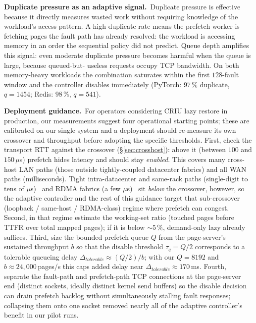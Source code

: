 \documentclass[journal]{IEEEtran}
\newcommand{\qthr}{\ensuremath{\tau_q}}
\begin{document}
\textbf{Duplicate pressure as an adaptive signal.}\, Duplicate pressure is
effective because it directly measures wasted work without requiring
knowledge of the workload's access pattern. A high duplicate rate means the
prefetch worker is fetching pages the fault path has already resolved:
the workload is accessing memory in an order the sequential policy did not
predict. Queue depth amplifies this signal: even moderate duplicate
pressure becomes harmful when the queue is large, because queued-but-
useless requests occupy TCP bandwidth. On both memory-heavy workloads the
combination saturates within the first $128$-fault window and the
controller disables immediately (PyTorch: $97\,\%$ duplicate, $q\!=\!1454$;
Redis: $98\,\%$, $q\!=\!541$).

\textbf{Deployment guidance.}\, For operators considering CRIU lazy restore
in production, our measurements suggest four operational starting points;
these are calibrated on our single system and a deployment should re-measure
its own crossover and throughput before adopting the specific thresholds.
First,
check the transport RTT against the crossover (\S\ref{sec:crosshost}): above
it (between $100$ and $150\,\mu$s) prefetch hides latency and should stay
\emph{enabled}. This covers many cross-host LAN paths (those outside
tightly-coupled datacenter fabrics) and all WAN paths (milliseconds). Tight intra-datacenter
and same-rack paths (single-digit to tens of $\mu$s)~\cite{gao2016network}
and RDMA fabrics (a few $\mu$s)~\cite{gu2017infiniswap} sit \emph{below} the
crossover, however, so the adaptive controller and the rest
of this guidance target that sub-crossover (loopback / same-host /
RDMA-class) regime where prefetch can congest. Second, in that regime estimate the
working-set ratio (touched pages before TTFR over total mapped pages); if it
is below ${\sim}5\,\%$, demand-only lazy already suffices. Third, size the
bounded prefetch queue $Q$ from the page-server's sustained throughput $b$
so that the disable threshold $\qthr\!=\!Q/2$ corresponds to a tolerable
queueing delay $\Delta_\textit{tolerable}\!\approx\!(Q/2)/b$; with our
$Q\!=\!8192$ and $b\!\approx\!24{,}000$\,pages/s this caps added delay near
$\Delta_\textit{tolerable}\!\approx\!170$\,ms. Fourth, separate the
fault-path and prefetch-path TCP connections at the page-server end
(distinct sockets, ideally distinct kernel send buffers) so the disable
decision can drain prefetch backlog without simultaneously stalling fault
responses; collapsing them onto one socket removed nearly all of the
adaptive controller's benefit in our pilot runs.
\end{document}
